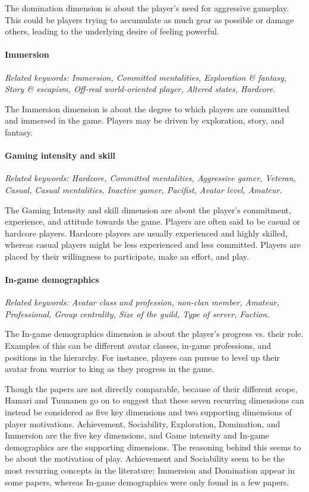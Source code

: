 The domination dimension is about the player’s need for aggressive gameplay. This could be players trying to accumulate as much gear as possible or damage others, leading to the underlying desire of feeling powerful.

\paragraph*{Immersion}
\textit{\footnotesize Related keywords: Immersion, Committed mentalities, Exploration \& fantasy, Story \& escapism, Off-real world-oriented player, Altered states, Hardcore.}

The Immersion dimension is about the degree to which players are committed and immersed in the game. Players may be driven by exploration, story, and fantasy. 
    
\paragraph*{Gaming intensity and skill}
\textit{\footnotesize Related keywords: Hardcore, Committed mentalities, Aggressive gamer, Veteran, Casual, Casual mentalities, Inactive gamer, Pacifist, Avatar level, Amateur.}

The Gaming Intensity and skill dimension are about the player’s commitment, experience, and attitude towards the game. Players are often said to be casual or hardcore players. Hardcore players are usually experienced and highly skilled, whereas casual players might be less experienced and less committed.  Players are placed by their willingness to participate, make an effort, and play.
    
\paragraph*{In-game demographics}
\textit{\footnotesize Related keywords: Avatar class and profession, non-clan member, Amateur, Professional, Group centrality, Size of the guild, Type of server, Faction.}

The In-game demographics dimension is about the player’s progress vs. their role. Examples of this can be different avatar classes, in-game professions, and positions in the hierarchy. For instance, players can pursue to level up their avatar from warrior to king as they progress in the game.

Though the papers are not directly comparable, because of their different scope, Hamari and Tuunanen go on to suggest that these seven recurring dimensions can instead be considered as five key dimensions and two supporting dimensions of player motivations. Achievement, Sociability, Exploration, Domination, and Immersion are the five key dimensions, and Game intensity and In-game demographics are the supporting dimensions. The reasoning behind this seems to be about the motivation of play. Achievement and Sociability seem to be the most recurring concepts in the literature; Immersion and Domination appear in some papers, whereas In-game demographics were only found in a few papers.


